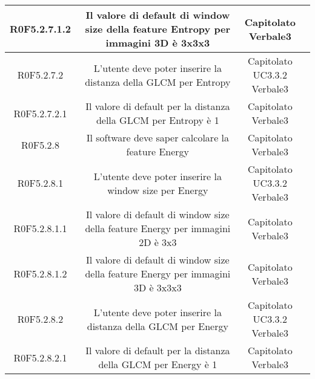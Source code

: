 \begin{center}
\begin{longtable}{|c|c|c|c|}
\hline
R0F5.2.7.1.2   & \parbox[t]{\larghezza}{Il valore di default di window size della feature\glossario{} Entropy per immagini 3D è 3x3x3 }  & \parbox[t]{\dimFonti}{ Capitolato \\ Verbale3 \\} \\
\hline
R0F5.2.7.2   & \parbox[t]{\larghezza}{L'utente deve poter inserire la distanza della GLCM per Entropy}  & \parbox[t]{\dimFonti}{ Capitolato \\ UC3.3.2 \\ Verbale3 \\} \\
\hline
R0F5.2.7.2.1   & \parbox[t]{\larghezza}{Il valore di default per la distanza della GLCM per Entropy è 1}  & \parbox[t]{\dimFonti}{ Capitolato \\ Verbale3 \\} \\
\hline
R0F5.2.8   & \parbox[t]{\larghezza}{Il software deve saper calcolare la feature\glossario{} Energy}  & \parbox[t]{\dimFonti}{ Capitolato \\ Verbale3 \\} \\
\hline
R0F5.2.8.1   & \parbox[t]{\larghezza}{L'utente deve poter inserire la window size per Energy}  & \parbox[t]{\dimFonti}{ Capitolato \\ UC3.3.2 \\ Verbale3 \\} \\
\hline
R0F5.2.8.1.1   & \parbox[t]{\larghezza}{Il valore di default di window size della feature\glossario{} Energy per immagini 2D è 3x3 }  & \parbox[t]{\dimFonti}{ Capitolato \\ Verbale3 \\} \\
\hline
R0F5.2.8.1.2   & \parbox[t]{\larghezza}{Il valore di default di window size della feature\glossario{} Energy per immagini 3D è 3x3x3}  & \parbox[t]{\dimFonti}{ Capitolato \\ Verbale3 \\} \\
\hline
R0F5.2.8.2   & \parbox[t]{\larghezza}{L'utente deve poter inserire la distanza della GLCM per Energy}  & \parbox[t]{\dimFonti}{ Capitolato \\ UC3.3.2 \\ Verbale3 \\} \\
\hline
R0F5.2.8.2.1   & \parbox[t]{\larghezza}{Il valore di default per la distanza della GLCM per Energy è 1}  & \parbox[t]{\dimFonti}{ Capitolato \\ Verbale3 \\} \\

\end{longtable}
\end{center}
